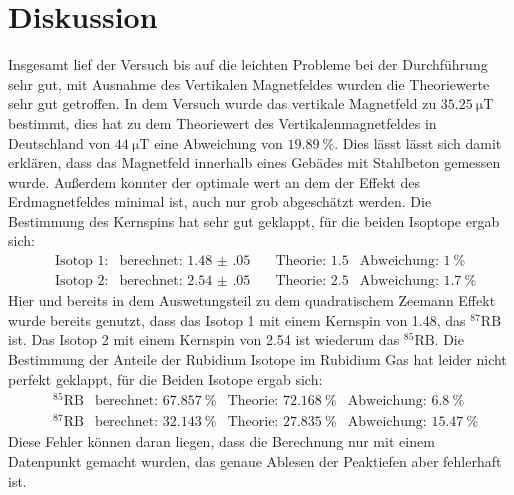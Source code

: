 \section{Diskussion}

	Insgesamt lief der Versuch bis auf die leichten Probleme bei der Durchführung sehr gut, mit Ausnahme des Vertikalen Magnetfeldes wurden die Theoriewerte sehr gut getroffen.
	In dem Versuch wurde das vertikale Magnetfeld zu $\SI{35.25}{\micro\tesla}$ bestimmt, dies hat zu dem Theoriewert\cite{Erdmag} des Vertikalenmagnetfeldes in Deutschland von $\SI{44}{\micro\tesla}$ eine Abweichung von $\SI{19.89}{\percent}$.
	Dies lässt lässt sich damit erklären, dass das Magnetfeld innerhalb eines Gebädes mit Stahlbeton gemessen wurde.
	Außerdem konnter der optimale wert an dem der Effekt des Erdmagnetfeldes minimal ist, auch nur grob abgeschätzt werden.
	Die Bestimmung des Kernspins hat sehr gut geklappt, für die beiden Isoptope ergab sich:
	\begin{align*}
		&\text{Isotop 1:} & \text{berechnet: }\num{1.48(05)}\quad &\text{Theorie: }\num{1.5} &\text{Abweichung: }\SI{1}{\percent}  \\
		&\text{Isotop 2:} & \text{berechnet: }\num{2.54(05)}\quad &\text{Theorie: }\num{2.5} &\text{Abweichung: }\SI{1.7}{\percent}
	\end{align*}
	Hier und bereits in dem Auswetungsteil zu dem quadratischem Zeemann Effekt wurde bereits genutzt, dass das Isotop 1 mit einem Kernspin von \num{1.48}, das $^{87}\text{RB}$ ist. 
	Das Isotop 2 mit einem Kernspin von \num{2.54} ist wiederum das $^{85}{\text{RB}}$.
	Die Bestimmung der Anteile der Rubidium Isotope im Rubidium Gas\cite{Rubidium} hat leider nicht perfekt geklappt, für die Beiden Isotope ergab sich:
	\begin{align*}
		&^85\text{RB} & \text{berechnet: }\SI{67.857}{\percent} &\text{Theorie: }\SI{72.168}{\percent} &\text{Abweichung: }\SI{6.8}{\percent} \\
		&^87\text{RB} & \text{berechnet: }\SI{32.143}{\percent} &\text{Theorie: }\SI{27.835}{\percent} &\text{Abweichung: }\SI{15.47}{\percent} 
	\end{align*}
	Diese Fehler können daran liegen, dass die Berechnung nur mit einem Datenpunkt gemacht wurden, das genaue Ablesen der Peaktiefen aber fehlerhaft ist. 

